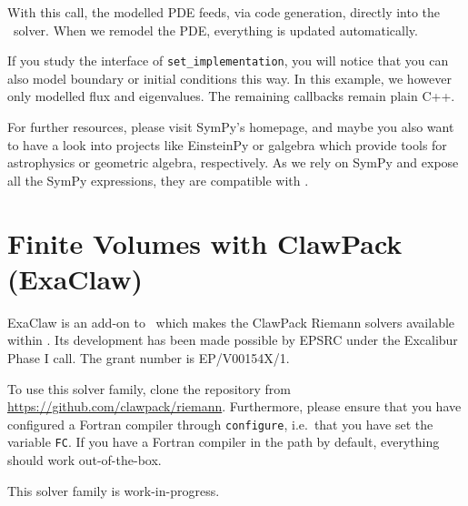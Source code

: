 \noindent
With this call, the modelled PDE feeds, via code generation, directly into the
\ExaHyPE\ solver. When we remodel the PDE, everything is updated automatically.


If you study the interface of \texttt{set\_implementation}, you will notice that
you can also model boundary or initial conditions this way.
In this example, we however only modelled flux and eigenvalues.
The remaining callbacks remain plain C++.


For further resources, please visit SymPy's homepage, and maybe you also want to
have a look into projects like EinsteinPy or galgebra which provide tools for
astrophysics or geometric algebra, respectively.
As we rely on SymPy and expose all the SymPy expressions, they are compatible
with \ExaHyPE.




\section{Finite Volumes with ClawPack (ExaClaw)}

ExaClaw is an add-on to \ExaHyPE\ which makes
the ClawPack Riemann solvers available within \ExaHyPE.
Its development has been made possible by EPSRC under the Excalibur
Phase I call.
The grant number is EP/V00154X/1.



To use this solver family, clone the repository from
\url{https://github.com/clawpack/riemann}.
Furthermore, please ensure that you have configured a Fortran compiler through
\texttt{configure}, i.e.~that you have set the variable \texttt{FC}.
If you have a Fortran compiler in the path by default, everything should work
out-of-the-box.

\begin{remark}
 This solver family is work-in-progress.
\end{remark}



 


